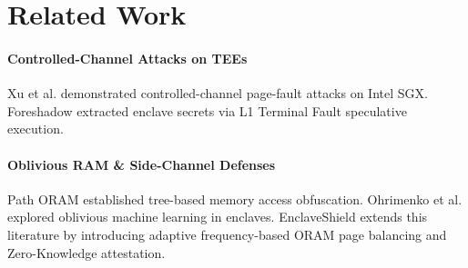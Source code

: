 \section{Related Work}
\label{sec:related_work}

\paragraph{Controlled-Channel Attacks on TEEs}
Xu et al. \cite{xu2015controlled} demonstrated controlled-channel page-fault attacks on Intel SGX. Foreshadow \cite{vanbulck2018foreshadow} extracted enclave secrets via L1 Terminal Fault speculative execution.

\paragraph{Oblivious RAM & Side-Channel Defenses}
Path ORAM \cite{stefanov2013pathoram} established tree-based memory access obfuscation. Ohrimenko et al. \cite{ohrimenko2016oblivious} explored oblivious machine learning in enclaves. EnclaveShield extends this literature by introducing adaptive frequency-based ORAM page balancing and Zero-Knowledge attestation.
